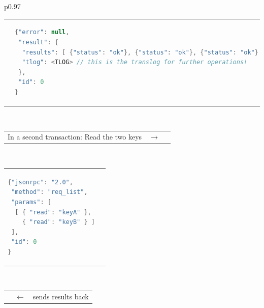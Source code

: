 \documentclass[a4paper]{scrreprt}
\begin{document}
\begin{longtable}{p{}}
\begin{tabular}{p{}p{}}
& 
\vspace{-1.5em}%
\begin{lstlisting}[language=java]
{"error": null,
 "result": {
  "results": [ {"status": "ok"}, {"status": "ok"}, {"status": "ok"} ],
  "tlog": <TLOG> // this is the translog for further operations!
 },
 "id": 0
}
\end{lstlisting} \\
\end{tabular}\vspace{-1em} \\
%
\begin{tabular}{p{}cp{}}
In a second transaction: Read the two keys & $\to$ & \\
\end{tabular}\vspace{-1.5em} \\
%
\begin{tabular}{p{}p{}}
\vspace{-1.5em}%
\begin{lstlisting}[language=java]
{"jsonrpc": "2.0",
 "method": "req_list",
 "params": [
  [ { "read": "keyA" },
    { "read": "keyB" } ]
 ],
 "id": 0
}
\end{lstlisting}
& \\
\end{tabular}\vspace{-1em} \\
%
\begin{tabular}{p{}cp{}}
 & $\leftarrow$ & \hfill{}\scalaris{} sends results back \\
\end{tabular}\vspace{-1.5em} \\


\end{longtable}
\end{document}
